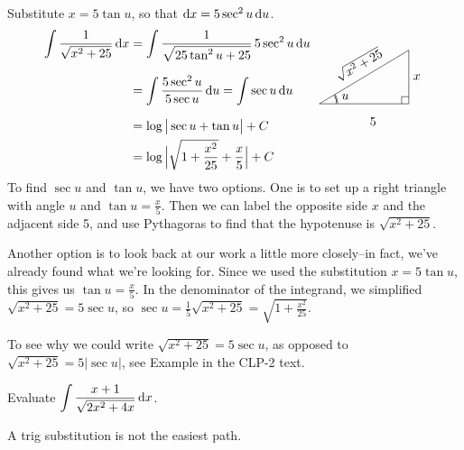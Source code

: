 \begin{solution} 
Substitute $x=5\tan u$, so that $\mathrm{d}x=5 \sec^2u\,\mathrm{d}u$.
\begin{align*}
\int\frac{1}{\sqrt{x^2+25}}\,\dee{x}
&=\int \frac{1}{\sqrt{25\tan^2 u+25}}\,5\sec^2 u\,\dee{u}   \\[0.1in]
&=\int \frac{5\sec^2u}{5\sec u}\,\dee{u}
=\int \sec u\,\dee{u} \\[0.1in]
&= \log\big|\sec u+\tan u\big|+C
\qquad\qquad\smash{
\trigtri{u}{5}{x}{\sqrt{x^2+25}}} \\
&= \log\Big|\sqrt{1+\frac{x^2}{25}}+\frac{x}{5}\Big|+C
\end{align*}
To find $\sec u$ and $\tan u$, we have two options. One is to set up a right triangle with angle $u$ and $\tan u = \frac{x}{5}$. Then we can label the opposite side $x$ and the adjacent side 5, and use Pythagoras to find that the hypotenuse is $\sqrt{x^2+25}$.

Another option is to look back at our work a little more closely--in fact, we've already found what we're looking for. Since we used the substitution $x=5\tan u$, this gives us $\tan u = \frac{x}{5}$. In the denominator of the integrand, we simplified $\sqrt{x^2+25} = 5\sec u$, so $\sec u = \frac{1}{5}\sqrt{x^2+25} = \sqrt{1+\frac{x^2}{25}}$.

To see why we could write $\sqrt{x^2+25} =5\sec u$, as opposed to 
$\sqrt{x^2+25} =5|\sec u|$,  see
Example  in the CLP-2 text.


\end{solution}
\begin{question}
Evaluate $\displaystyle\int\frac{x+1}{\sqrt{2x^2+4x}}
\, \mathrm{d}x$.
\end{question}
\begin{hint}
A trig substitution is not the easiest path.
\end{hint}
